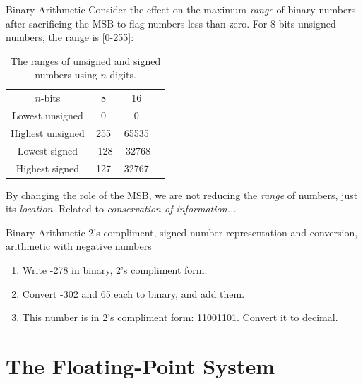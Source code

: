 \documentclass{beamer}
\begin{document}
\begin{frame}{Binary Arithmetic}
Consider the effect on the maximum \textit{range} of binary numbers after sacrificing the MSB to flag numbers less than zero.  For 8-bits unsigned numbers, the range is [0-255]: \\ \vspace{0.5cm}
\begin{table}
\small
\centering
\begin{tabular}{c c c c}
$n$-bits & 8 & 16 \\
Lowest unsigned & 0 & 0 \\
Highest unsigned & 255 & 65535 \\
Lowest signed & -128 & -32768 \\
Highest signed & 127 & 32767
\end{tabular}
\caption{\label{tab:ranges} The ranges of unsigned and signed numbers using $n$ digits.}
\end{table}
\small
By changing the role of the MSB, we are not reducing the \textit{range} of numbers, just its \textit{location}.  Related to \textit{conservation of information...}
\end{frame}

\begin{frame}{Binary Arithmetic}
2's compliment, signed number representation and conversion, arithmetic with negative numbers \\ 
\hrulefill
\begin{enumerate}
\item Write -278 in binary, 2's compliment form.
\item Convert -302 and 65 each to binary, and add them.
\item This number is in 2's compliment form: 11001101.  Convert it to decimal. 
\end{enumerate}
\end{frame}

\section{The Floating-Point System}
\end{document}
